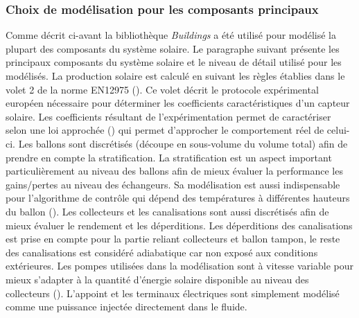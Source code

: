 





\subsubsection{Choix de modélisation pour les composants principaux} %
\label{ssub:choix_de_modelisation_pour_les_composants_principaux}
Comme décrit ci-avant la bibliothèque \emph{Buildings} a été utilisé pour modélisé
la plupart des composants du système solaire. Le paragraphe suivant présente les principaux
composants du système solaire et le niveau de détail utilisé pour les modélisés.
La production solaire est calculé en suivant les règles établies dans le volet 2 de
la norme EN12975 (). Ce volet décrit le protocole expérimental
européen nécessaire pour déterminer les coefficients caractéristiques d’un capteur solaire.
Les coefficients résultant de l’expérimentation permet de caractériser selon une loi
approchée () qui permet d’approcher le comportement réel de celui-ci.
Les ballons sont discrétisés (découpe en sous-volume du volume total)
afin de prendre en compte la stratification. La stratification est un aspect important
particulièrement au niveau des ballons afin de mieux évaluer la performance les
gains/pertes au niveau des échangeurs. Sa modélisation est aussi indispensable
pour l’algorithme de contrôle qui dépend des températures à différentes
hauteurs du ballon ().
Les collecteurs et les canalisations sont aussi discrétisés afin de mieux évaluer
le rendement et les déperditions.
Les déperditions des canalisations est prise en compte pour la partie reliant
collecteurs et ballon tampon, le reste des canalisations est considéré adiabatique
car non exposé aux conditions extérieures.
Les pompes utilisées dans la modélisation sont à vitesse variable pour mieux s’adapter
à la quantité d’énergie solaire disponible au niveau des collecteurs ().
L’appoint et les terminaux électriques sont simplement modélisé comme une puissance
injectée directement dans le fluide.



